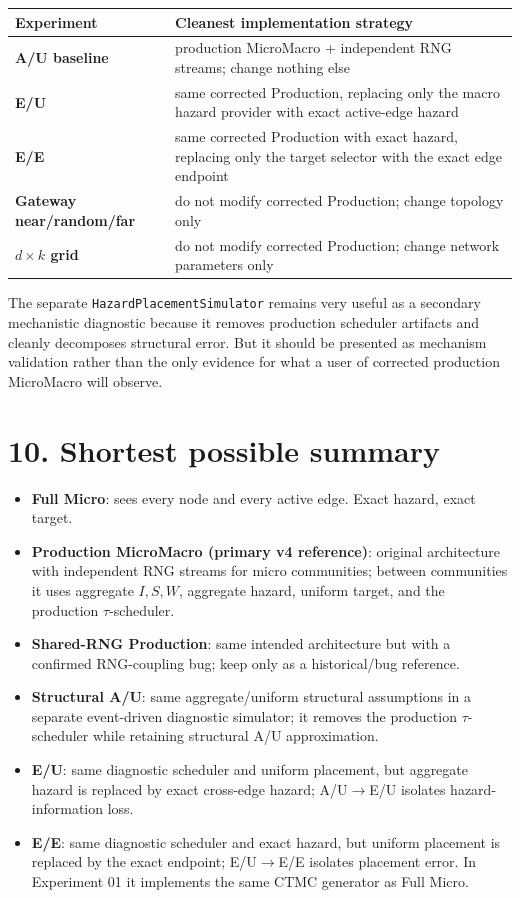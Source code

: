 \documentclass[11pt,a4paper]{article}
\begin{document}
\begin{center}
\begin{tabularx}{\textwidth}{>{\bfseries}p{35mm} X}
\toprule
Experiment & Cleanest implementation strategy\\
\midrule
A/U baseline & production MicroMacro + independent RNG streams; change nothing else\\
E/U & same corrected Production, replacing only the macro hazard provider with exact active-edge hazard\\
E/E & same corrected Production with exact hazard, replacing only the target selector with the exact edge endpoint\\
Gateway near/random/far & do not modify corrected Production; change topology only\\
$d\times k$ grid & do not modify corrected Production; change network parameters only\\
\bottomrule
\end{tabularx}
\end{center}

The separate \texttt{HazardPlacementSimulator} remains very useful as a secondary mechanistic diagnostic because it removes production scheduler artifacts and cleanly decomposes structural error. But it should be presented as mechanism validation rather than the only evidence for what a user of corrected production MicroMacro will observe.

\section*{10. Shortest possible summary}
\begin{itemize}[leftmargin=*,itemsep=4pt]
\item \textbf{Full Micro}: sees every node and every active edge. Exact hazard, exact target.
\item \textbf{Production MicroMacro (primary v4 reference)}: original architecture with independent RNG streams for micro communities; between communities it uses aggregate $I,S,W$, aggregate hazard, uniform target, and the production $\tau$-scheduler.
\item \textbf{Shared-RNG Production}: same intended architecture but with a confirmed RNG-coupling bug; keep only as a historical/bug reference.
\item \textbf{Structural A/U}: same aggregate/uniform structural assumptions in a separate event-driven diagnostic simulator; it removes the production $\tau$-scheduler while retaining structural A/U approximation.
\item \textbf{E/U}: same diagnostic scheduler and uniform placement, but aggregate hazard is replaced by exact cross-edge hazard; A/U$\to$E/U isolates hazard-information loss.
\item \textbf{E/E}: same diagnostic scheduler and exact hazard, but uniform placement is replaced by the exact endpoint; E/U$\to$E/E isolates placement error. In Experiment 01 it implements the same CTMC generator as Full Micro.
\end{itemize}
\end{document}
